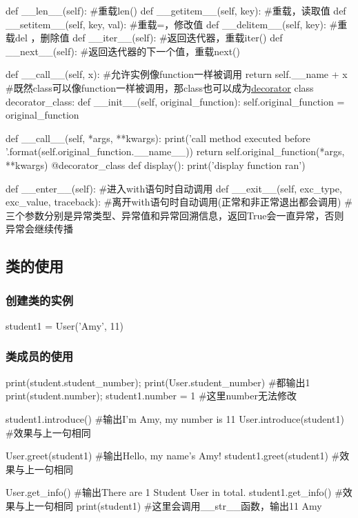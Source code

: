 \documentclass{article}
\begin{document}
\begin{codeblock}[language=python, caption={Special members for class}]
          def __len__(self): #重载len()
          def __getitem__(self, key): #重载\lbrack\rbrack，读取值
          def __setitem__(self, key, val): #重载\lbrack\rbrack=，修改值
          def __delitem__(self, key): #重载del \lbrack\rbrack，删除值
          def __iter__(self): #返回迭代器，重载iter()
          def __next__(self): #返回迭代器的下一个值，重载next()

          def __call__(self, x): #允许实例像function一样被调用
              return self.__name + x
          #既然class可以像function一样被调用，那class也可以成为\hyperref[subsubsec:decorator]{\underline{decorator}}
          class decorator_class:
              def __init__(self, original_function):
                  self.original_function = original_function

              def __call__(self, *args, **kwargs):
                  print('call method executed before {}'.format(self.original_function.__name__))
                  return self.original_function(*args, **kwargs)
          @decorator_class
          def display():
              print('display function ran')

          def __enter__(self): #进入with语句时自动调用
          def __exit__(self, exc_type, exc_value, traceback): 
          #离开with语句时自动调用(正常和非正常退出都会调用)
          #三个参数分别是异常类型、异常值和异常回溯信息，返回True会一直异常，否则异常会继续传播 
        \end{codeblock}
          
    \subsection{类的使用}
      \subsubsection{创建类的实例}
        \begin{codeblock}[language=python, caption={Create an instance of class}]
          student1 = User('Amy', 11) 
        \end{codeblock}

      \subsubsection{类成员的使用}
        \begin{codeblock}[language=python, caption={Using class members}]
          print(student.student_number); print(User.student_number) #都输出1
          print(student.number); student1.number = 1 #这里number无法修改

          student1.introduce() #输出I'm Amy, my number is 11
          User.introduce(student1) #效果与上一句相同

          User.greet(student1) #输出Hello, my name's Amy!
          student1.greet(student1) #效果与上一句相同

          User.get_info() #输出There are 1 Student User in total.
          student1.get_info() #效果与上一句相同
          print(student1) #这里会调用\_\_str\_\_函数，输出11 Amy
        \end{codeblock}
\end{document}
